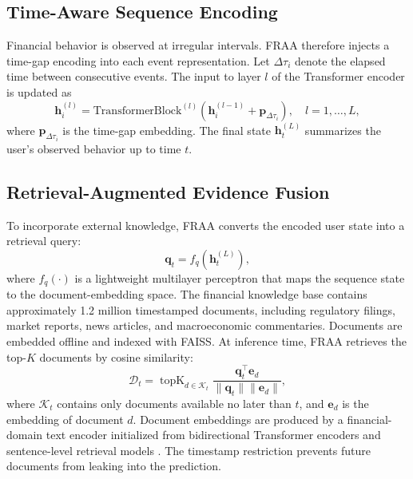 \documentclass[runningheads]{llncs}
\begin{document}
\subsection{Time-Aware Sequence Encoding}
Financial behavior is observed at irregular intervals. FRAA therefore injects a time-gap encoding into each event representation. Let $\Delta \tau_i$ denote the elapsed time between consecutive events. The input to layer $l$ of the Transformer encoder is updated as
\begin{equation}
\mathbf{h}_i^{(l)} =
\mathrm{TransformerBlock}^{(l)}\left(\mathbf{h}_i^{(l-1)} + \mathbf{p}_{\Delta \tau_i}\right),
\quad l=1,\ldots,L,
\label{eq:time_transformer}
\end{equation}
where $\mathbf{p}_{\Delta \tau_i}$ is the time-gap embedding. The final state $\mathbf{h}_t^{(L)}$ summarizes the user's observed behavior up to time $t$.

\subsection{Retrieval-Augmented Evidence Fusion}
\label{sec:retrieval}
To incorporate external knowledge, FRAA converts the encoded user state into a retrieval query:
\begin{equation}
\mathbf{q}_t = f_q(\mathbf{h}_t^{(L)}),
\label{eq:query}
\end{equation}
where $f_q(\cdot)$ is a lightweight multilayer perceptron that maps the sequence state to the document-embedding space. The financial knowledge base contains approximately 1.2 million timestamped documents, including regulatory filings, market reports, news articles, and macroeconomic commentaries. Documents are embedded offline and indexed with FAISS. At inference time, FRAA retrieves the top-$K$ documents by cosine similarity:
\begin{equation}
\mathcal{D}_t =
\operatorname{topK}_{d \in \mathcal{K}_t}
\frac{\mathbf{q}_t^\top \mathbf{e}_d}{\|\mathbf{q}_t\|\|\mathbf{e}_d\|},
\label{eq:retrieval}
\end{equation}
where $\mathcal{K}_t$ contains only documents available no later than $t$, and $\mathbf{e}_d$ is the embedding of document $d$. Document embeddings are produced by a financial-domain text encoder initialized from bidirectional Transformer encoders and sentence-level retrieval models \cite{devlin2019bert,reimers2019sentence}. The timestamp restriction prevents future documents from leaking into the prediction.
\end{document}
